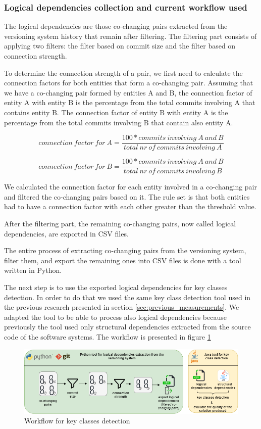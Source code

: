 \documentclass[12pt]{mitthesis}
\begin{document}
\subsubsection{Logical dependencies collection and current workflow used}

The logical dependencies are those co-changing pairs extracted from the versioning system history that remain after filtering. The filtering part consists of applying two filters: the filter based on commit size and the filter based on connection strength. 

To determine the connection strength of a pair, we first need to calculate the connection factors for both entities that form a co-changing pair.
Assuming that we have a co-changing pair formed by entities A and B, the connection factor of entity A with entity B is the percentage from the total commits involving A that contains entity B. The connection factor of entity B with entity A is the percentage from the total commits involving B that contain also entity A.

\[ connection\ factor\ for\ A 
  = \dfrac{100 * commits\ involving\ A\ and\ B}{total\ nr\ of\ commits\ involving\ A}
\]

\[ connection\ factor\ for\ B 
  = \dfrac{100 * commits\ involving\ A\ and\ B}{total\ nr\ of\ commits\ involving\ B}
\]

We calculated the connection factor for each entity involved in a co-changing pair and filtered the co-changing pairs based on it. The rule set is that both entities had to have a connection factor with each other greater than the threshold value.

After the filtering part, the remaining co-changing pairs, now called logical dependencies, are exported in CSV files.

The entire process of extracting co-changing pairs from the versioning system, filter them, and export the remaining ones into CSV files is done with a tool written in Python.

The next step is to use the exported logical dependencies for key classes detection. In order to do that we used the same key class detection tool used in the previous research presented in section \ref{sec:previous_measurements}. We adapted the tool to be able to process also logical dependencies because previously the tool used only structural dependencies extracted from the source code of the software systems. 
The workflow is presented in figure \ref{fig:workflow_key}

\begin{figure}[H]
\centering
\includegraphics[width=\textwidth]{key_class_workflow.png}
\caption{Workflow for key classes detection}
\label{fig:workflow_key}
\centering
\end{figure}
\end{document}
